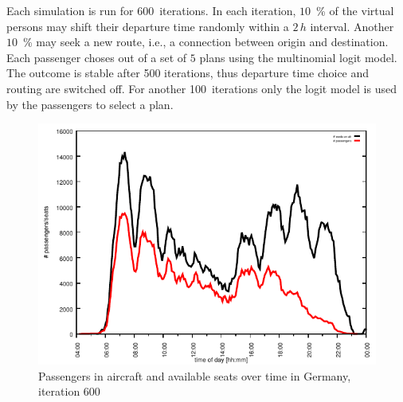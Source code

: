 
Each simulation is run for $600$~iterations.
In each iteration, $10$~\% of the virtual persons may shift their departure time randomly within a $2 \, h$ interval.
Another $10$~\% may seek a new route, i.e., a connection between origin and destination. 
Each passenger choses out of a set of $5$ plans using the multinomial logit model. %
The outcome is stable after 500 iterations, thus departure time choice and routing are switched off. 
For another 100~iterations only the logit model is used by the passengers to select a plan. 

\begin{figure}[t]
	\centering
	\includegraphics[width=0.9\linewidth]{./extending/figures/air/in_vehicle_histogram_flight_1876_it_600.pdf}
	\caption{Passengers in aircraft and available seats over time in Germany, iteration 600}
	\label{fig:2009_passengers_seats}
\end{figure}

